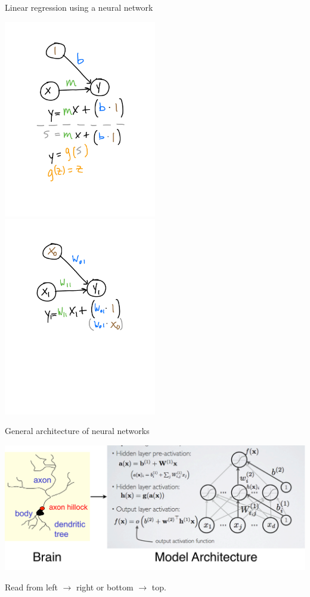 \documentclass[xetex,compress]{beamer}
\begin{document}
\begin{frame}{Linear regression using a neural network}
  \begin{center}
    \includegraphics[width=0.50\textwidth]{./figures/lr_nn_1.pdf}
    \includegraphics[width=0.50\textwidth]{./figures/lr_nn_3.pdf}
  \end{center}
\end{frame}

\begin{frame}{General architecture of neural networks}
  \begin{center}
    \includegraphics[width=1.00\textwidth]{./figures/brain_to_model.pdf}
  \end{center}
  Read from left \(\rightarrow\) right or bottom \(\rightarrow\) top.
\end{frame}
\end{document}

